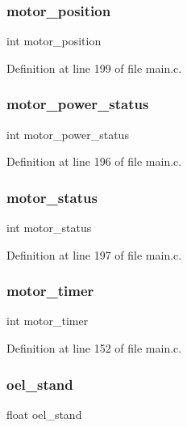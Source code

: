 \subsubsection{motor\+\_\+position}
{\footnotesize\ttfamily int motor\+\_\+position}



Definition at line 199 of file main.\+c.

\mbox{\label{main_8c_af0534d2439970a744b5fb040e8e06ae6}} 
\subsubsection{motor\+\_\+power\+\_\+status}
{\footnotesize\ttfamily int motor\+\_\+power\+\_\+status}



Definition at line 196 of file main.\+c.

\mbox{\label{main_8c_ab91b2f7221f13b214149f3513c286a1c}} 
\subsubsection{motor\+\_\+status}
{\footnotesize\ttfamily int motor\+\_\+status}



Definition at line 197 of file main.\+c.

\mbox{\label{main_8c_ae835483f889f5b6b2f9fd7b4550b366c}} 
\subsubsection{motor\+\_\+timer}
{\footnotesize\ttfamily int motor\+\_\+timer}



Definition at line 152 of file main.\+c.

\mbox{\label{main_8c_a5c5872dd96f0fa71559e07608865fa8a}} 
\subsubsection{oel\+\_\+stand}
{\footnotesize\ttfamily float oel\+\_\+stand}



